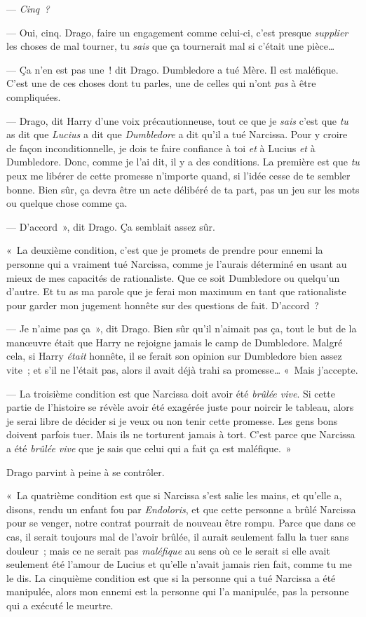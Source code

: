 --- \emph{Cinq~?}

--- Oui, cinq. Drago, faire un engagement comme celui-ci, c'est presque \emph{supplier} les choses de mal tourner, tu \emph{sais} que ça tournerait mal si c'était une pièce…

--- Ça n'en est pas une~! dit Drago. Dumbledore a tué Mère. Il est maléfique. C'est une de ces choses dont tu parles, une de celles qui n'ont \emph{pas} à être compliquées.

--- Drago, dit Harry d'une voix précautionneuse, tout ce que je \emph{sais} c'est que \emph{tu} as dit que \emph{Lucius} a dit que \emph{Dumbledore} a dit qu'il a tué Narcissa. Pour y croire de façon inconditionnelle, je dois te faire confiance à toi \emph{et} à Lucius \emph{et} à Dumbledore. Donc, comme je l'ai dit, il y a des conditions. La première est que \emph{tu} peux me libérer de cette promesse n'importe quand, si l'idée cesse de te sembler bonne. Bien sûr, ça devra être un acte délibéré de ta part, pas un jeu sur les mots ou quelque chose comme ça.

--- D'accord~», dit Drago. Ça semblait assez sûr.

«~La deuxième condition, c'est que je promets de prendre pour ennemi la personne qui a vraiment tué Narcissa, comme je l'aurais déterminé en usant au mieux de mes capacités de rationaliste. Que ce soit Dumbledore ou quelqu'un d'autre. Et tu as ma parole que je ferai mon maximum en tant que rationaliste pour garder mon jugement honnête sur des questions de fait. D'accord~?

--- Je n'aime pas ça~», dit Drago. Bien sûr qu'il n'aimait pas ça, tout le but de la manœuvre était que Harry ne rejoigne jamais le camp de Dumbledore. Malgré cela, si Harry \emph{était} honnête, il se ferait son opinion sur Dumbledore bien assez vite~; et s'il ne l'était pas, alors il avait déjà trahi sa promesse… «~Mais j'accepte.

--- La troisième condition est que Narcissa doit avoir été \emph{brûlée vive}. Si cette partie de l'histoire se révèle avoir été exagérée juste pour noircir le tableau, alors je serai libre de décider si je veux ou non tenir cette promesse. Les gens bons doivent parfois tuer. Mais ils ne torturent jamais à tort. C'est parce que Narcissa a été \emph{brûlée vive} que je sais que celui qui a fait ça est maléfique.~»

Drago parvint à peine à se contrôler.

«~La quatrième condition est que si Narcissa s'est salie les mains, et qu'elle a, disons, rendu un enfant fou par \emph{Endoloris}, et que cette personne a brûlé Narcissa pour se venger, notre contrat pourrait de nouveau être rompu. Parce que dans ce cas, il serait toujours mal de l'avoir brûlée, il aurait seulement fallu la tuer sans douleur~; mais ce ne serait pas \emph{maléfique} au sens où ce le serait si elle avait seulement été l'amour de Lucius et qu'elle n'avait jamais rien fait, comme tu me le dis. La cinquième condition est que si la personne qui a tué Narcissa a été manipulée, alors mon ennemi est la personne qui l'a manipulée, pas la personne qui a exécuté le meurtre.

